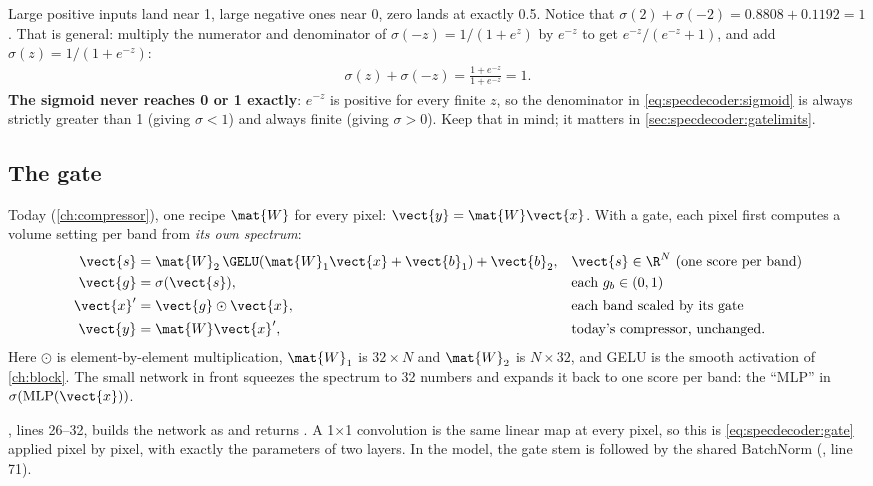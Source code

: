 Large positive inputs land near 1, large negative ones near 0, zero lands at exactly 0.5. Notice that $\sigma(2) + \sigma(-2) = 0.8808 + 0.1192 = 1$. That is general: multiply the numerator and denominator of $\sigma(-z) = 1/(1 + e^{z})$ by $e^{-z}$ to get $e^{-z}/(e^{-z} + 1)$, and add $\sigma(z) = 1/(1 + e^{-z})$:
\begin{align*}
  \sigma(z) + \sigma(-z) = \frac{1 + e^{-z}}{1 + e^{-z}} = 1 .
\end{align*}
\textbf{The sigmoid never reaches 0 or 1 exactly}: $e^{-z}$ is positive for every finite $z$, so the denominator in \cref{eq:specdecoder:sigmoid} is always strictly greater than 1 (giving $\sigma < 1$) and always finite (giving $\sigma > 0$). Keep that in mind; it matters in \cref{sec:specdecoder:gatelimits}.

\subsection{The gate}

Today (\cref{ch:compressor}), one recipe $\mat{W}$ for every pixel: $\vect{y} = \mat{W}\vect{x}$. With a gate, each pixel first computes a volume setting per band from \emph{its own spectrum}:
\begin{align}
  \vect{s} &= \mat{W}_2\,\GELU(\mat{W}_1\vect{x} + \vect{b}_1) + \vect{b}_2, & &\vect{s}\in\R^{N}\ \text{(one score per band)} \nonumber\\
  \vect{g} &= \sigma(\vect{s}), & &\text{each } g_b\in(0, 1) \nonumber\\
  \vect{x}' &= \vect{g}\odot\vect{x}, & &\text{each band scaled by its gate} \nonumber\\
  \vect{y} &= \mat{W}\vect{x}', & &\text{today's compressor, unchanged.}\label{eq:specdecoder:gate}
\end{align}
Here $\odot$ is element-by-element multiplication, $\mat{W}_1$ is $32\times N$ and $\mat{W}_2$ is $N\times32$, and GELU is the smooth activation of \cref{ch:block}. The small network in front squeezes the spectrum to 32 numbers and expands it back to one score per band: the ``MLP'' in $\sigma(\text{MLP}(\vect{x}))$.

\begin{sourcenote}
, lines 26--32, builds the network as  and returns . A 1$\times$1 convolution is the same linear map at every pixel, so this is \cref{eq:specdecoder:gate} applied pixel by pixel, with exactly the parameters of two  layers. In the model, the gate stem is  followed by the shared BatchNorm (, line 71).
\end{sourcenote}

